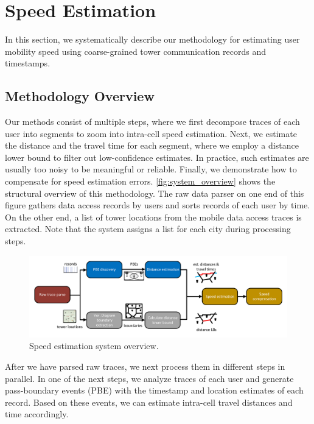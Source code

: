   \section{Speed Estimation}\label{approach}

In this section, we systematically describe our methodology for estimating user mobility speed using coarse-grained tower communication records and timestamps.

\subsection{Methodology Overview}

Our methods consist of multiple steps, where we first decompose traces of each user into segments to zoom into intra-cell speed estimation. Next, we estimate the distance and the travel time for each segment, where we employ a distance lower bound to filter out low-confidence estimates. In practice, such estimates are usually too noisy to be meaningful or reliable. Finally, we demonstrate how to compensate for speed estimation errors. \autoref{fig:system_overview} shows the structural overview of this methodology. The raw data parser on one end of this figure gathers data access records by users and sorts records of each user by time. On the other end, a list of tower locations from the mobile data access traces is extracted. Note that the system assigns a list for each city during processing steps.

\begin{figure}[h]
    \centering
    \includegraphics[width=\linewidth]{./figures/system_overview.pdf}
    \vspace{-0.4in}
    \caption{Speed estimation system overview.}
    \label{fig:system_overview}
    \vspace{-0.1in}
\end{figure}


After we have parsed raw traces, we next process them in different steps in parallel. In one of the next steps, we analyze traces of each user and generate pass-boundary events (PBE) with the timestamp and location estimates of each record. Based on these events, we can estimate intra-cell travel distances and time accordingly.

